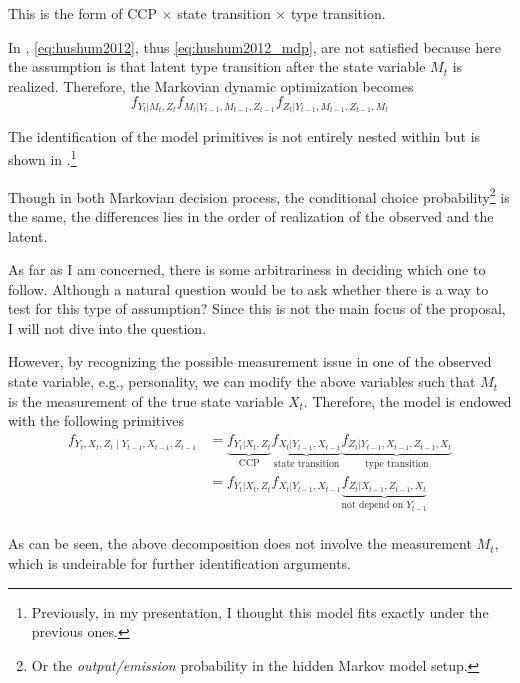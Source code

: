 \documentclass[12pt]{article}
\begin{document}
This is the form of CCP $\times$ state transition $\times$ type transition.

In \citet{todd2020dynamic}, \ref{eq:hushum2012}, thus \ref{eq:hushum2012_mdp}, are not satisfied because here the assumption is that latent type transition after the state variable $M_t$ is realized. Therefore, the Markovian dynamic optimization becomes
\begin{equation}\label{eq:huetal2015_mdp}
    f_{Y_t|M_t,Z_t}f_{M_t|Y_{t-1},M_{t-1},Z_{t-1}}f_{Z_t|Y_{t-1},M_{t-1},Z_{t-1},M_t}
\end{equation}

The identification of the model primitives is not entirely nested within \citet{hu2012nonparametric} but is shown in \citet{hu2017simple}.\footnote{Previously, in my presentation, I thought this model fits exactly under the previous ones.}

Though in both Markovian decision process, the conditional choice probability\footnote{Or the \textit{output/emission} probability in the hidden Markov model setup.} is the same, the differences lies in the order of realization of the observed and the latent.

As far as I am concerned, there is some arbitrariness in deciding which one to follow. Although a natural question would be to ask whether there is a way to test for this type of assumption? Since this is not the main focus of the proposal, I will not dive into the question.

However, by recognizing the possible measurement issue in one of the observed state variable, e.g., personality, we can modify the above variables such that $M_t$ is the measurement of the true state variable $X_t$. Therefore, the model is endowed with the following primitives
\begin{equation}
    \begin{split}
        f_{Y_t, X_t, Z_t\mid Y_{t-1},X_{t-1}, Z_{t-1}} & =\underbrace{f_{Y_t|X_t,Z_t}}_{\text{CCP}}\underbrace{f_{X_t|Y_{t-1},X_{t-1}}}_{\text{state transition}}\underbrace{f_{Z_t|Y_{t-1},X_{t-1},Z_{t-1},X_t}}_{\text{type transition}} \\
        & =f_{Y_t|X_t,Z_t}f_{X_t|Y_{t-1},X_{t-1}}\underbrace{f_{Z_t|X_{t-1},Z_{t-1},X_t}}_{\text{not depend on $Y_{t-1}$}}                                                                  \\
    \end{split}
\end{equation}

As can be seen, the above decomposition does not involve the measurement $M_t$, which is undeirable for further identification arguments.
\end{document}
